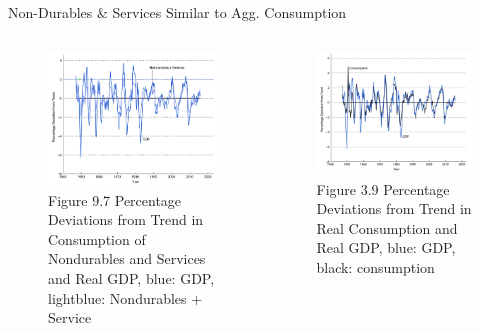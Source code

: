 \documentclass[11pt,aspectratio=43]{beamer}
\theoremstyle{definition}
\begin{document}
\begin{frame}{Non-Durables \& Services Similar to Agg. Consumption}
\label{slide:Non_Durables_and_Services_Behaves_Similar_to_Agg__Consumption}
\begin{columns}
    \begin{column}{0.5\textwidth}
        \begin{figure}
            \caption{\scriptsize Figure 9.7 Percentage Deviations from Trend in Consumption of Nondurables and Services and Real GDP, \alert{blue: GDP}, \alert{lightblue: Nondurables + Service}}
            \includegraphics[width=\textwidth]{./figures/Figure9_7.jpg}
        \end{figure}
    \end{column}
    \begin{column}{0.5\textwidth}
        \begin{figure}
            \caption{\scriptsize Figure 3.9 Percentage Deviations from Trend in \alert{Real Consumption} and Real GDP, \alert{blue: GDP}, black: consumption}
            \includegraphics[width=\textwidth]{../Lecture_03/figures/Figure3_9.jpg}
        \end{figure}
    \end{column}
\end{columns}
\end{frame}
\end{document}
